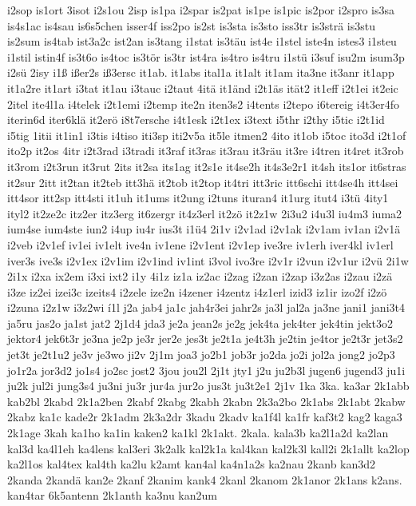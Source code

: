 {i2sop
is1ort
3isot
i2s1ou
2isp
is1pa
i2spar
is2pat
is1pe
is1pic
is2por
i2spro
is3sa
is4s1ac
is4sau
is6s5chen
isser4f
iss2po
is2st
is3sta
is3sto
iss3tr
is3strä
is3stu
is2sum
is4tab
ist3a2c
ist2an
is3tang
i1stat
is3täu
ist4e
i1stel
iste4n
istes3
i1steu
i1stil
istin4f
is3t6o
is4toc
is3tör
is3tr
ist4ra
is4tro
is4tru
i1stü
i3suf
isu2m
isum3p
i2sü
2isy
i1ß
ißer2s
iß3ersc
it1ab.
it1abs
ital1a
it1alt
it1am
ita3ne
it3anr
it1app
it1a2re
it1art
i3tat
it1au
i3tauc
i2taut
4itä
it1änd
i2t1äs
ität2
it1eff
i2t1ei
it2eic
2itel
ite4l1a
i4telek
i2t1emi
i2temp
ite2n
iten3s2
i4tents
i2tepo
i6tereig
i4t3er4fo
iterin6d
iter6klä
it2erö
i8t7ersche
i4t1esk
i2t1ex
i3text
i5thr
i2thy
i5tic
i2t1id
i5tig
1itii
it1in1
i3tis
i4tiso
iti3sp
iti2v5a
it5le
itmen2
4ito
it1ob
i5toc
ito3d
i2t1of
ito2p
it2os
4itr
i2t3rad
i3tradi
it3raf
it3ras
it3rau
it3räu
it3re
i4tren
it4ret
it3rob
it3rom
i2t3run
it3rut
2its
it2sa
its1ag
it2s1e
it4se2h
it4s3e2r1
it4sh
its1or
it6stras
it2sur
2itt
it2tan
it2teb
itt3hä
it2tob
it2top
it4tri
itt3ric
itt6schi
itt4se4h
itt4sei
itt4sor
itt2sp
itt4sti
it1uh
it1ums
it2ung
i2tuns
ituran4
it1urg
itut4
i3tü
4ity1
ityl2
it2ze2c
itz2er
itz3erg
it6zergr
it4z3erl
it2zö
it2z1w
2i3u2
i4u3l
iu4m3
iuma2
ium4se
ium4ste
iun2
i4up
iu4r
ius3t
i1ü4
2i1v
i2v1ad
i2v1ak
i2v1am
iv1an
i2v1ä
i2veb
i2v1ef
iv1ei
iv1elt
ive4n
iv1ene
i2v1ent
i2v1ep
ive3re
iv1erh
iver4kl
iv1erl
iver3s
ive3s
i2v1ex
i2v1im
i2v1ind
iv1int
i3vol
ivo3re
i2v1r
i2vun
i2v1ur
i2vü
2i1w
2i1x
i2xa
ix2em
i3xi
ixt2
i1y
4i1z
iz1a
iz2ac
i2zag
i2zan
i2zap
i3z2as
i2zau
i2zä
i3ze
iz2ei
izei3c
izeits4
i2zele
ize2n
i4zener
i4zentz
i4z1erl
izid3
iz1ir
izo2f
i2zö
i2zuna
i2z1w
i3z2wi
í1l
j2a
jab4
ja1c
jah4r3ei
jahr2s
ja3l
jal2a
ja3ne
jani1
jani3t4
ja5ru
jas2o
ja1st
jat2
2j1d4
jda3
je2a
jean2s
je2g
jek4ta
jek4ter
jek4tin
jekt3o2
jektor4
jek6t3r
je3na
je2p
je3r
jer2e
jes3t
je2t1a
je4t3h
je2tin
je4tor
je2t3r
jet3s2
jet3t
je2t1u2
je3v
je3wo
ji2v
2j1m
joa3
jo2b1
job3r
jo2da
jo2i
jol2a
jong2
jo2p3
jo1r2a
jor3d2
jo1s4
jo2sc
jost2
3jou
jou2l
2j1t
jty1
j2u
ju2b3l
jugen6
jugend3
ju1i
ju2k
jul2i
jung3s4
ju3ni
ju3r
jur4a
jur2o
jus3t
ju3t2e1
2j1v
1ka
3ka.
ka3ar
2k1abb
kab2bl
2kabd
2k1a2ben
2kabf
2kabg
2kabh
2kabn
2k3a2bo
2k1abs
2k1abt
2kabw
2kabz
ka1c
kade2r
2k1adm
2k3a2dr
3kadu
2kadv
ka1f4l
ka1fr
kaf3t2
kag2
kaga3
2k1age
3kah
ka1ho
ka1in
kaken2
ka1kl
2k1akt.
2kala.
kala3b
ka2l1a2d
ka2lan
kal3d
ka4l1eh
ka4lens
kal3eri
3k2alk
kal2k1a
kal4kan
kal2k3l
kall2i
2k1allt
ka2lop
ka2l1os
kal4tex
kal4th
ka2lu
k2amt
kan4al
ka4n1a2s
ka2nau
2kanb
kan3d2
2kanda
2kandä
kan2e
2kanf
2kanim
kank4
2kanl
2kanom
2k1anor
2k1ans
k2ans.
kan4tar
6k5antenn
2k1anth
ka3nu
kan2um
}
